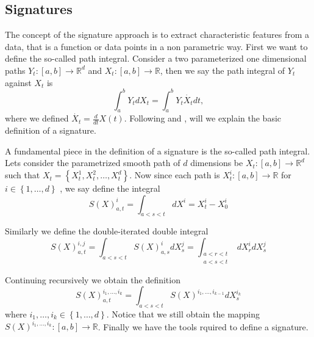 

\subsection{Signatures}%
\label{sec:background}


The concept of the signature approach is to extract characteristic features from a data, that is a function or data points in a non parametric way.
First we want to define the so-called path integral.
Consider a two parameterized one dimensional paths  $Y_{t}: [a,b] \to  \mathbb{R} ^{d} $ and $X_t: [a,b] \to \mathbb{R} $, then we say the path integral of $Y_{t}$ against $X_{t}$  is \begin{equation}
    \int_{a}^{b} Y_{t} dX_{t} = \int_{a}^{b}  Y_{t} \dot{X_{t}}dt,
\end{equation}  where we defined $ \dot{X_{t}} = \frac{d}{dt}X( t)   $. Following \cite{Reizenstein2016} and  \cite{chevyrev2016primer}, will we explain the basic definition of a signature.



A fundamental piece in the definition of a signature is
the so-called path integral.
Lets consider the parametrized smooth path of $d$ dimensions be $X_{t}: \left[ a,b \right] \to  \mathbb{R} ^{d}  $ such that $X_{t} = \left\{ X^{1}_{t},  X_{t}^{2}, \ldots, X_{t}^{d} \right\} $. Now since each path is $X^{i}_{t}: [a,b] \to
\mathbb{R} $ for $i \in \left\{ 1, \ldots, d \right\} $ , we say define the integral \begin{equation}
    S( X)_{a,t}^{i} =  \int_{a < s < t}^{} dX^{i} = X^{i}_{t} - X_{0}^{i}
\end{equation}

Similarly we define the double-iterated double integral \begin{equation*}
    S( X)^{i,j}_{a,t} = \int_{a < s<t}^{} S( X)_{a,s}^{i}dX^{j}_{s} = \int_{\substack{a < r < t \\ a < s < t}}^{} dX^{i}_{r} dX^{j}_{s}
\end{equation*}


 Continuing recursively we obtain the definition \begin{equation*}
     S( X) _{a,t}^{i_{1},\ldots, i_{k}} =  \int_{a < s <t}^{} S( X) ^{i_{1}, \ldots, i_{k-1}} dX^{i_{k}}_{s}
 \end{equation*}
 where $i_{1}, \ldots, i_{k} \in \left\{ 1, \ldots, d \right\} $. Notice that we still obtain the mapping $S( X)^{i_{1}, \ldots, i_{k}}: [a,b] \to \mathbb{R}  $.  Finally we have the tools rquired to define a signature.

